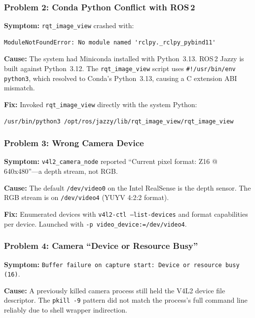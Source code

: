 \documentclass[11pt,a4paper]{article}
\begin{document}
\subsubsection{Problem 2: Conda Python Conflict with ROS\,2}

\textbf{Symptom:} \texttt{rqt\_image\_view} crashed with:
\begin{lstlisting}
ModuleNotFoundError: No module named 'rclpy._rclpy_pybind11'
\end{lstlisting}

\textbf{Cause:} The system had Miniconda installed with Python~3.13. ROS\,2 Jazzy is built against Python~3.12. The \texttt{rqt\_image\_view} script uses \texttt{\#!/usr/bin/env python3}, which resolved to Conda's Python~3.13, causing a C extension ABI mismatch.

\textbf{Fix:} Invoked \texttt{rqt\_image\_view} directly with the system Python:
\begin{lstlisting}[language=bash]
/usr/bin/python3 /opt/ros/jazzy/lib/rqt_image_view/rqt_image_view
\end{lstlisting}

\subsubsection{Problem 3: Wrong Camera Device}

\textbf{Symptom:} \texttt{v4l2\_camera\_node} reported ``Current pixel format: Z16 @ 640x480''---a depth stream, not RGB.

\textbf{Cause:} The default \texttt{/dev/video0} on the Intel RealSense is the depth sensor. The RGB stream is on \texttt{/dev/video4} (YUYV 4:2:2 format).

\textbf{Fix:} Enumerated devices with \texttt{v4l2-ctl --list-devices} and format capabilities per device. Launched with \texttt{-p video\_device:=/dev/video4}.

\subsubsection{Problem 4: Camera ``Device or Resource Busy''}

\textbf{Symptom:} \texttt{Buffer failure on capture start: Device or resource busy (16)}.

\textbf{Cause:} A previously killed camera process still held the V4L2 device file descriptor. The \texttt{pkill -9} pattern did not match the process's full command line reliably due to shell wrapper indirection.
\end{document}
